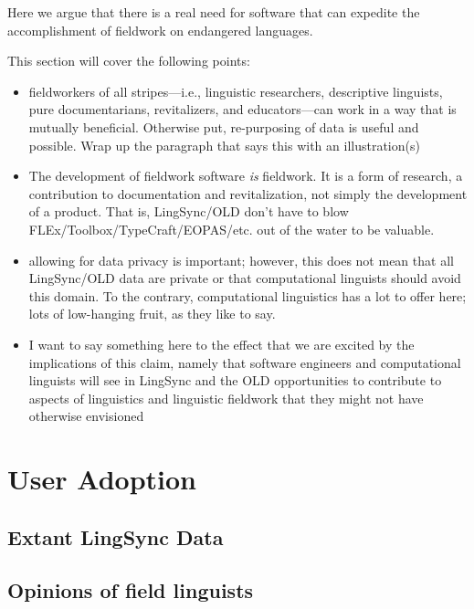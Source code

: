 \documentclass[11pt]{article}
\begin{document}
Here we argue that there is a real need for software that can expedite the 
accomplishment of fieldwork on endangered languages.

This section will cover the following points:

\begin{itemize}
    \item fieldworkers of all stripes---i.e., linguistic researchers,
        descriptive linguists, pure documentarians, revitalizers, and
        educators---can work in a way that is mutually beneficial.
        Otherwise put, re-purposing of data is useful and possible.
        Wrap up the paragraph that says this with an illustration(s)
    \item The development of fieldwork software \textit{is} fieldwork. It is
        a form of research, a contribution to documentation and revitalization,
        not simply the development of a product. That is, LingSync/OLD don't have
        to blow FLEx/Toolbox/TypeCraft/EOPAS/etc. out of the water to be valuable.
    \item allowing for data privacy is important; however, this does not mean
        that all LingSync/OLD data are private or that computational linguists
        should avoid this domain. To the contrary, computational linguistics has
        a lot to offer here; lots of low-hanging fruit, as they like to say.
    \item I want to say something here to the effect that we are excited by
        the implications of this claim, namely that software engineers and
        computational linguists will see in LingSync and the OLD opportunities
        to contribute to aspects of linguistics and linguistic fieldwork that
        they might not have otherwise envisioned
\end{itemize}



\section{User Adoption}

\subsection{Extant LingSync Data}




\subsection{Opinions of field linguists}
\end{document}
